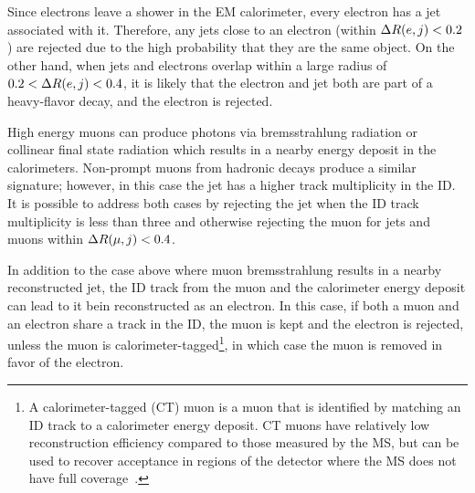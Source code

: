 Since electrons leave a shower in the EM calorimeter, every electron has a jet associated with it.
Therefore, any jets close to an electron (within $\Delta R(e,j) < 0.2$) are rejected due to the high probability that they are the same object.
On the other hand, when jets and electrons overlap within a large radius of $0.2 < \Delta R(e,j) < 0.4$, it is likely that the electron and jet both are part of a heavy-flavor decay, and the electron is rejected.

High energy muons can produce photons via bremsstrahlung radiation or collinear final state radiation which results in a nearby energy deposit in the calorimeters.
Non-prompt muons from hadronic decays produce a similar signature; however, in this case the jet has a higher track multiplicity in the ID.
It is possible to address both cases by rejecting the jet when the ID track multiplicity is less than three and otherwise rejecting the muon for jets and muons within $\Delta R(\mu,j) < 0.4$.

In addition to the case above where muon bremsstrahlung results in a nearby reconstructed jet, the ID track from the muon and the calorimeter energy deposit can lead to it bein reconstructed as an electron.
In this case, if both a muon and an electron share a track in the ID, the muon is kept and the electron is rejected, unless the muon is calorimeter-tagged\footnote{A calorimeter-tagged (CT) muon is a muon that is identified by matching an ID track to a calorimeter energy deposit.  CT muons have relatively low reconstruction efficiency compared to those measured by the MS, but can be used to recover acceptance in regions of the detector where the MS does not have full coverage~\cite{2016.muon-reconstruction-13tev}.}, in which case the muon is removed in favor of the electron.

